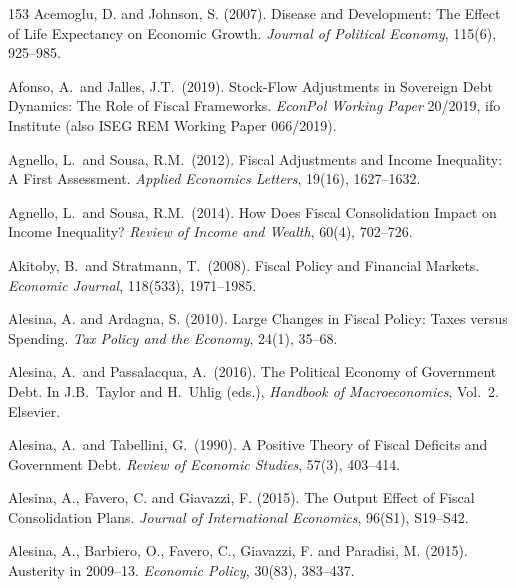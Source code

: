 \documentclass[11pt,a4paper]{article}
\begin{document}

\begin{thebibliography}{153}
 Acemoglu, D. and Johnson, S. (2007). Disease and Development: The Effect of Life Expectancy on Economic Growth. \textit{Journal of Political Economy}, 115(6), 925--985.

 Afonso, A.\ and Jalles, J.T.\ (2019). Stock-Flow Adjustments in Sovereign Debt Dynamics: The Role of Fiscal Frameworks. \textit{EconPol Working Paper} 20/2019, ifo Institute (also ISEG REM Working Paper 066/2019).

 Agnello, L.\ and Sousa, R.M.\ (2012). Fiscal Adjustments and Income Inequality: A First Assessment. \textit{Applied Economics Letters}, 19(16), 1627--1632.

 Agnello, L.\ and Sousa, R.M.\ (2014). How Does Fiscal Consolidation Impact on Income Inequality? \textit{Review of Income and Wealth}, 60(4), 702--726.

 Akitoby, B.\ and Stratmann, T.\ (2008). Fiscal Policy and Financial Markets. \textit{Economic Journal}, 118(533), 1971--1985.

 Alesina, A. and Ardagna, S. (2010). Large Changes in Fiscal Policy: Taxes versus Spending. \textit{Tax Policy and the Economy}, 24(1), 35--68.

 Alesina, A.\ and Passalacqua, A.\ (2016). The Political Economy of Government Debt. In J.B.\ Taylor and H.\ Uhlig (eds.), \textit{Handbook of Macroeconomics}, Vol.\ 2. Elsevier.

 Alesina, A.\ and Tabellini, G.\ (1990). A Positive Theory of Fiscal Deficits and Government Debt. \textit{Review of Economic Studies}, 57(3), 403--414.

 Alesina, A., Favero, C. and Giavazzi, F. (2015). The Output Effect of Fiscal Consolidation Plans. \textit{Journal of International Economics}, 96(S1), S19--S42.

 Alesina, A., Barbiero, O., Favero, C., Giavazzi, F. and Paradisi, M. (2015). Austerity in 2009--13. \textit{Economic Policy}, 30(83), 383--437.


\end{thebibliography}
\end{document}
